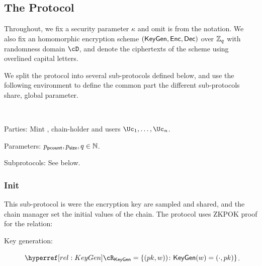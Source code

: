 \subsection{The Protocol}\label{sec:MainProtocol:Protocol}
Throughout, we fix a security parameter $\kappa$ and omit is from the notation. We also fix an homomorphic encryption scheme $(\mathsf{KeyGen},\mathsf{Enc},\mathsf{Dec})$ over ${\mathbb Z}_q$ with randomness domain $\cD$, and denote the ciphertexts of the scheme using  overlined capital letters.  %


We split  the protocol into several sub-protocols defined below, and  use the  following environment to define the common part the different sub-protocols share, \eg global parameter. 

\begin{protocol}~\label{prot:ConfidentialTransactions}


	
\item[Parties:] Mint \Mc, chain-holder \Cc and users  $\Uc_1, \ldots,\Uc_n$.

\item[Parameters:] $p_{\mathsf{pcount}},p_{\mathsf{size}},q \in {\mathbb{N}}$.

\item[Subprotocols:]  See below.
\end{protocol}


\subsubsection{Init}


This sub-protocol is were the encryption key are sampled and shared, and the chain manager \Cc set the initial values of the chain. The protocol  uses ZKPOK proof for the relation:
\begin{description}
	\item[Key generation:]    $\rKeyGen =\rKeyGenDef$.\label{rel:KeyGen}
\end{description}


